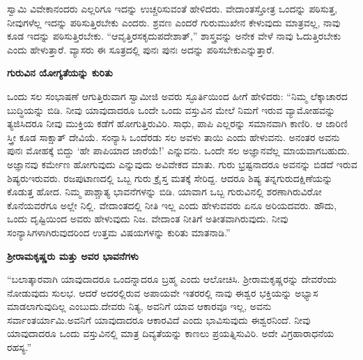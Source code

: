 ಸ್ವಾಮಿ ವಿವೇಕಾನಂದರು ಎಲ್ಲರಿಗೂ ಇದನ್ನು ಉಚ್ಚರಿಸುವಂತೆ ಹೇಳಿದರು. ವೇದಾಂತಸ್ತೋತ್ರ ಒಂದನ್ನು ಪಠಿಸುತ್ತ, ನೀವುಗಳೆಲ್ಲ ಇದನ್ನು ಪಠಿಸುತ್ತಿರಬೇಕು ಎಂದರು. ಶ್ರವಣ ಎಂದರೆ ಗುರುಮುಖೇನ ಕೇಳುವುದು ಮಾತ್ರವಲ್ಲ, ನಾವು ಕೂಡ ಇದನ್ನು ಪಠಿಸುತ್ತಿರಬೇಕು. “ಆವೃತ್ತಿರಸಕೃದುಪದೇಶಾತ್​,” ಶಾಸ್ತ್ರವನ್ನು ಅನೇಕ ವೇಳೆ ನಾವು ಓದುತ್ತಿರಬೇಕು ಎಂದು ಹೇಳುತ್ತಾರೆ. ವ್ಯಾಸರು ಈ ಸೂತ್ರದಲ್ಲಿ ಪುನಃ ಪುನಃ ಅದನ್ನು ಪಠಿಸಬೇಕು\break ಎನ್ನುತ್ತಾರೆ.

\centerline{\textbf{ಗುರುವಿನ ಯೋಗ್ಯತೆಯನ್ನು ಕುರಿತು}}

ಒಂದು ಸಲ ಸಂಭಾಷಣೆ ಆಗುತ್ತಿರುವಾಗ ಸ್ವಾಮೀಜಿ ಅವರು ಸ್ಫೂರ್ತಿಯಿಂದ ಹೀಗೆ ಹೇಳಿದರು: “ನಿಮ್ಮ ಲೆಕ್ಕಾಚಾರದ ಬುದ್ಧಿಯನ್ನು ಬಿಡಿ. ನೀವು ಯಾವುದಾದರೂ ಒಂದೇ ಒಂದು ವಸ್ತುವಿನ ಮೇಲೆ ನಿಮಗೆ ಇರುವ ವ್ಯಾಮೋಹವನ್ನು ತ್ಯಜಿಸಿದರೂ ನೀವು ಮುಕ್ತಿಯ ಕಡೆಗೆ ಹೋಗುತ್ತಿರುವಿರಿ. ಸಾಧು, ಪಾಪಿ ಎಲ್ಲರನ್ನು ಸಮಾನವಾಗಿ ಕಾಣಿರಿ. ಆ ಜಾರಿಣಿ ಸ್ತ್ರೀ ಕೂಡ ಸಾಕ್ಷಾತ್​ ದೇವಿಯೆ. ಸಂನ್ಯಾಸಿ ಒಂದೆರಡು ಸಲ ಅವಳು ತಾಯಿ ಎಂದು ಹೇಳುವನು. ಅನಂತರ ಅವನು ಪುನಃ ಮೋಹಕ್ಕೆ ಬಿದ್ದು ‘ಹೇ ಪಾಪಿಯಾದ ಜಾರೆಯೆ!’ ಎನ್ನುವನು. ಒಂದೇ ಸಲ ಅಜ್ಞಾನವೆಲ್ಲ ಮಾಯವಾಗಬಹುದು. ಅಜ್ಞಾನವು ಕರ್ಮೇಣ ಹೋಗುವುದು ಎನ್ನುವುದು ಅವಿವೇಕದ ಮಾತು. ಗುರು ಭ್ರಷ್ಟನಾದರೂ ಅವನನ್ನು ಬಿಡದೆ ಇರುವ ಶಿಷ್ಯರು\break ಇರುವರು. ರಜಪುಟಾಣದಲ್ಲಿ ಒಬ್ಬ ಗುರು ಕ್ರೈಸ್ತ ಮತಕ್ಕೆ ಸೇರಿದ್ದ. ಆದರೂ ಶಿಷ್ಯ ತನ್ನ\break ಗುರುದಕ್ಷಿಣೆಯನ್ನು ಕೊಡುತ್ತ ಹೋದ. ನಿಮ್ಮ ಪಾಶ್ಚಾತ್ಯ ಭಾವನೆಗಳನ್ನು ಬಿಡಿ. ಯಾವಾಗ ಒಬ್ಬ ಗುರುವಿನಲ್ಲಿ ಶರಣಾಗಿರುವಿರೋ ಕೊನೆಯವರೆಗೂ ಅಲ್ಲೇ ನಿಲ್ಲಿ. ವೇದಾಂತದಲ್ಲಿ ನೀತಿ ಇಲ್ಲ ಎಂದು ಹೇಳುವವರು ಏನೂ ಅರಿಯದವರು. ಹೌದು, ಒಂದು ದೃಷ್ಟಿಯಿಂದ ಅವರು ಹೇಳುವುದು ನಿಜ. ವೇದಾಂತ ನೀತಿಗೆ ಅತೀತವಾಗಿರುವುದು. ನೀವು ಸಂನ್ಯಾಸಿಗಳಾಗಿರುವುದರಿಂದ ಉತ್ತಮ ವಿಷಯಗಳನ್ನು ಕುರಿತು ಮಾತನಾಡಿ.”

\centerline{\textbf{ಶ‍್ರೀರಾಮಕೃಷ್ಣರು ಮತ್ತು ಅವರ ಭಾವನೆಗಳು}}

“ಬಲಾತ್ಕಾರವಾಗಿ ಯಾವುದಾದರೂ ಒಂದನ್ನಾದರೂ ಬ್ರಹ್ಮ ಎಂದು ಆಲೋಚಿಸಿ. ಶ‍್ರೀರಾಮಕೃಷ್ಣರನ್ನು ದೇವರೆಂದು ನೋಡುವುದು ಸುಲಭ. ಆದರೆ ಅದರಲ್ಲಿರುವ ಅಪಾಯವೇ ಇತರರಲ್ಲಿ ನಾವು ಈಶ್ವರ ಭಕ್ತಿಯನ್ನು ಅಭ್ಯಾಸ ಮಾಡಲಾಗುವುದಿಲ್ಲ ಎಂಬುದು.\break ದೇವರು ನಿತ್ಯ, ಅವನಿಗೆ ಯಾವ ಆಕಾರವೂ ಇಲ್ಲ, ಅವನು ಸರ್ವಾಂತರ್ಯಾಮಿ.\break ಅವನಿಗೆ ಯಾವುದಾದರೂ ಆಕಾರವಿದೆ ಎಂದು ಭಾವಿಸುವುದು ಈಶ್ವರನಿಂದೆ. ನೀವು ಯಾವುದಾದರೂ ಒಂದು ವಸ್ತುವಿನಲ್ಲಿ ಮಾತ್ರ ದಿವ್ಯತೆಯನ್ನು ಕಾಣಲು ಪ್ರಯತ್ನಿಸುವಿರಿ. ಅದೇ ವಿಗ್ರಹಾರಾಧನೆಯ ರಹಸ್ಯ.”


